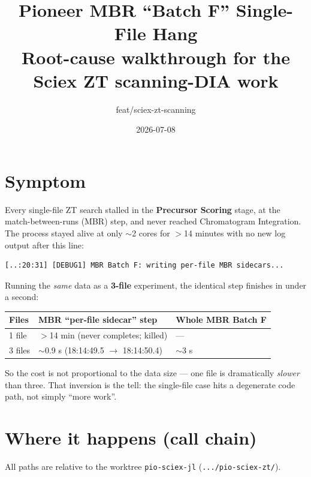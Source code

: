 \documentclass[11pt]{article}
\title{\textbf{Pioneer MBR ``Batch F'' Single-File Hang}\\[4pt]
\large Root-cause walkthrough for the Sciex ZT scanning-DIA work}
\author{feat/sciex-zt-scanning}
\date{2026-07-08}
\begin{document}
\maketitle

\section{Symptom}

Every single-file ZT search stalled in the \textbf{Precursor Scoring} stage, at the
match-between-runs (MBR) step, and never reached Chromatogram Integration. The
process stayed alive at only $\sim$2 cores for $>$14 minutes with no new log output
after this line:

\begin{Verbatim}[fontsize=\footnotesize,frame=single]
[..:20:31] [DEBUG1] MBR Batch F: writing per-file MBR sidecars...
\end{Verbatim}

Running the \emph{same} data as a \textbf{3-file} experiment, the identical step
finishes in under a second:

\begin{center}
\begin{tabular}{lll}
\hline
Files & MBR ``per-file sidecar'' step & Whole MBR Batch F \\
\hline
1 file  & $>$14 min (never completes; killed) & --- \\
3 files & $\sim$0.9 s (18:14:49.5 $\to$ 18:14:50.4) & $\sim$3 s \\
\hline
\end{tabular}
\end{center}

So the cost is not proportional to the data size --- one file is dramatically
\emph{slower} than three. That inversion is the tell: the single-file case hits a
degenerate code path, not simply ``more work''.

\section{Where it happens (call chain)}

All paths are relative to the worktree
\texttt{pio-sciex-jl} (\texttt{.../pio-sciex-zt/}).
\end{document}
